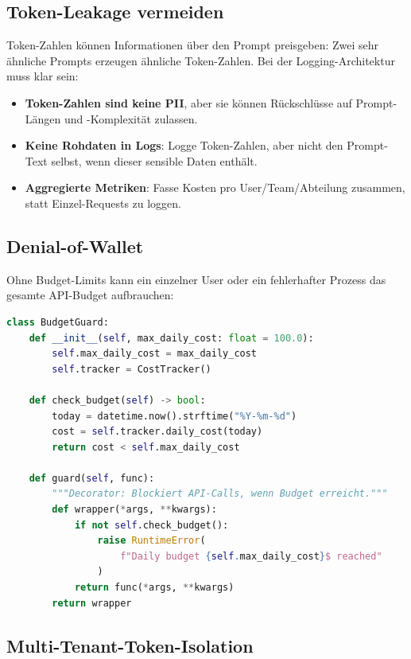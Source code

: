 \subsection{Token-Leakage vermeiden}

Token-Zahlen können Informationen über den Prompt preisgeben: Zwei sehr ähnliche Prompts erzeugen ähnliche Token-Zahlen. Bei der Logging-Architektur muss klar sein:

\begin{itemize}[leftmargin=*]
    \item \textbf{Token-Zahlen sind keine PII}, aber sie können Rückschlüsse auf Prompt-Längen und -Komplexität zulassen.
    \item \textbf{Keine Rohdaten in Logs}: Logge Token-Zahlen, aber nicht den Prompt-Text selbst, wenn dieser sensible Daten enthält.
    \item \textbf{Aggregierte Metriken}: Fasse Kosten pro User/Team/Abteilung zusammen, statt Einzel-Requests zu loggen.
\end{itemize}

\subsection{Denial-of-Wallet}

Ohne Budget-Limits kann ein einzelner User oder ein fehlerhafter Prozess das gesamte API-Budget aufbrauchen:

\begin{lstlisting}[language=Python, caption=Denial-of-Wallet-Praevention]
class BudgetGuard:
    def __init__(self, max_daily_cost: float = 100.0):
        self.max_daily_cost = max_daily_cost
        self.tracker = CostTracker()

    def check_budget(self) -> bool:
        today = datetime.now().strftime("%Y-%m-%d")
        cost = self.tracker.daily_cost(today)
        return cost < self.max_daily_cost

    def guard(self, func):
        """Decorator: Blockiert API-Calls, wenn Budget erreicht."""
        def wrapper(*args, **kwargs):
            if not self.check_budget():
                raise RuntimeError(
                    f"Daily budget {self.max_daily_cost}$ reached"
                )
            return func(*args, **kwargs)
        return wrapper
\end{lstlisting}

\subsection{Multi-Tenant-Token-Isolation}

